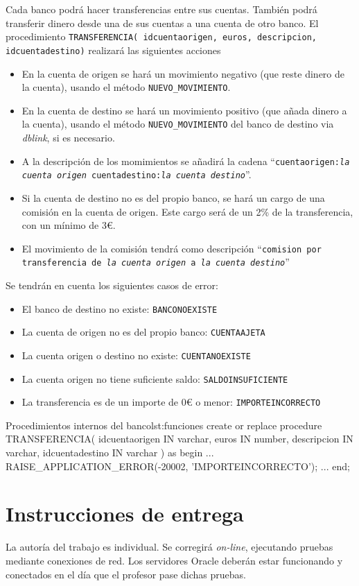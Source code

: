 \begin{homeworkProblem}
Cada banco podrá hacer transferencias entre sus cuentas. También podrá transferir dinero desde una de sus cuentas a una cuenta de otro banco. El procedimiento \texttt{TRANSFERENCIA( idcuentaorigen, euros, descripcion, idcuentadestino)} realizará las siguientes acciones
\begin{itemize}
\item En la cuenta de origen se hará un movimiento negativo (que reste dinero de la cuenta), usando el método \texttt{NUEVO\_MOVIMIENTO}.
\item En la cuenta de destino se hará un movimiento positivo (que añada dinero a la cuenta), usando el método \texttt{NUEVO\_MOVIMIENTO} del banco de destino via \textit{dblink}, si es necesario.
\item A la descripción de los momimientos se añadirá la cadena ``\texttt{cuentaorigen:\textit{la cuenta origen} cuentadestino:\textit{la cuenta destino}}''.
\item Si la cuenta de destino no es del propio banco, se hará un cargo de una comisión en la cuenta de origen. Este cargo será de un 2\% de la transferencia, con un mínimo de 3\euro.
\item El movimiento de la comisión tendrá como descripción ``\texttt{comision por transferencia de \textit{la cuenta origen} a \textit{la cuenta destino}}''  
\end{itemize}

Se tendrán en cuenta los siguientes casos de error:
\begin{itemize}
\item El banco de destino no existe: \texttt{BANCONOEXISTE}
\item La cuenta de origen no es del propio banco: \texttt{CUENTAAJETA}
\item La cuenta origen o destino no existe: \texttt{CUENTANOEXISTE}
\item La cuenta origen no tiene suficiente saldo: \texttt{SALDOINSUFICIENTE}
\item La transferencia es de un importe de 0{\euro} o menor: \texttt{IMPORTEINCORRECTO}
\end{itemize}

  \begin{listadosql}{Procedimientos internos del banco}{lst:funciones}
create or replace procedure TRANSFERENCIA(
  idcuentaorigen IN varchar, 
  euros IN number,
  descripcion IN varchar,
  idcuentadestino IN varchar )
as begin
  ...
  RAISE_APPLICATION_ERROR(-20002, 'IMPORTEINCORRECTO');
  ...
end; 

\end{listadosql}


\end{homeworkProblem}


\section{Instrucciones de entrega}
La autoría del trabajo es individual. Se corregirá \textit{on-line}, ejecutando pruebas mediante conexiones de red. Los servidores Oracle deberán estar funcionando y conectados en el día que el profesor pase dichas pruebas.








